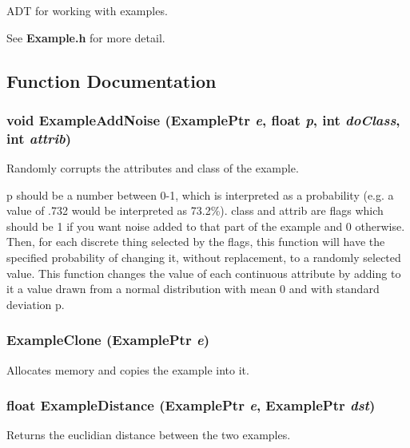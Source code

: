 ADT for working with examples. 

See {\bf Example.h} for more detail. 

\subsection{Function Documentation}
\subsubsection{\setlength{\rightskip}{0pt plus 5cm}void Example\-Add\-Noise ({\bf Example\-Ptr} {\em e}, float {\em p}, int {\em do\-Class}, int {\em attrib})}\label{Example_8h_a17}


Randomly corrupts the attributes and class of the example. 

p should be a number between 0-1, which is interpreted as a probability (e.g. a value of .732 would be interpreted as 73.2\%). class and attrib are flags which should be 1 if you want noise added to that part of the example and 0 otherwise. Then, for each discrete thing selected by the flags, this function will have the specified probability of changing it, without replacement, to a randomly selected value. This function changes the value of each continuous attribute by adding to it a value drawn from a normal distribution with mean 0 and with standard deviation p. 
\subsubsection{ Example\-Clone ({\bf Example\-Ptr} {\em e})}\label{Example_8h_a11}


Allocates memory and copies the example into it. 

\subsubsection{\setlength{\rightskip}{0pt plus 5cm}float Example\-Distance ({\bf Example\-Ptr} {\em e}, {\bf Example\-Ptr} {\em dst})}\label{Example_8h_a25}


Returns the euclidian distance between the two examples. 

